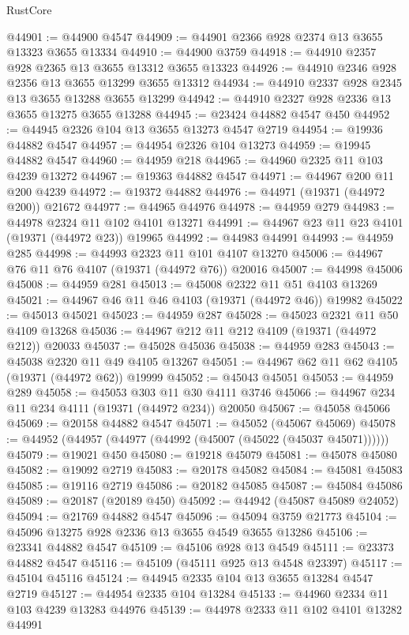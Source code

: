 \begin{lexlean}{RustCore}
\begin{coremodule}
@44901 := @44900 @4547
@44909 := @44901 @2366 @928 @2374 @13 @3655 @13323 @3655 @13334
@44910 := @44900 @3759
@44918 := @44910 @2357 @928 @2365 @13 @3655 @13312 @3655 @13323
@44926 := @44910 @2346 @928 @2356 @13 @3655 @13299 @3655 @13312
@44934 := @44910 @2337 @928 @2345 @13 @3655 @13288 @3655 @13299
@44942 := @44910 @2327 @928 @2336 @13 @3655 @13275 @3655 @13288
@44945 := @23424 @44882 @4547 @450
@44952 := @44945 @2326 @104 @13 @3655 @13273 @4547 @2719
@44954 := @19936 @44882 @4547
@44957 := @44954 @2326 @104 @13273
@44959 := @19945 @44882 @4547
@44960 := @44959 @218
@44965 := @44960 @2325 @11 @103 @4239 @13272
@44967 := @19363 @44882 @4547
@44971 := @44967 @200 @11 @200 @4239
@44972 := @19372 @44882
@44976 := @44971 (@19371 (@44972 @200)) @21672
@44977 := @44965 @44976
@44978 := @44959 @279
@44983 := @44978 @2324 @11 @102 @4101 @13271
@44991 := @44967 @23 @11 @23 @4101 (@19371 (@44972 @23)) @19965
@44992 := @44983 @44991
@44993 := @44959 @285
@44998 := @44993 @2323 @11 @101 @4107 @13270
@45006 := @44967 @76 @11 @76 @4107 (@19371 (@44972 @76)) @20016
@45007 := @44998 @45006
@45008 := @44959 @281
@45013 := @45008 @2322 @11 @51 @4103 @13269
@45021 := @44967 @46 @11 @46 @4103 (@19371 (@44972 @46)) @19982
@45022 := @45013 @45021
@45023 := @44959 @287
@45028 := @45023 @2321 @11 @50 @4109 @13268
@45036 := @44967 @212 @11 @212 @4109 (@19371 (@44972 @212)) @20033
@45037 := @45028 @45036
@45038 := @44959 @283
@45043 := @45038 @2320 @11 @49 @4105 @13267
@45051 := @44967 @62 @11 @62 @4105 (@19371 (@44972 @62)) @19999
@45052 := @45043 @45051
@45053 := @44959 @289
@45058 := @45053 @303 @11 @30 @4111 @3746
@45066 := @44967 @234 @11 @234 @4111 (@19371 (@44972 @234)) @20050
@45067 := @45058 @45066
@45069 := @20158 @44882 @4547
@45071 := @45052 (@45067 @45069)
@45078 := @44952 (@44957 (@44977 (@44992 (@45007 (@45022 (@45037 @45071))))))
@45079 := @19021 @450
@45080 := @19218 @45079
@45081 := @45078 @45080
@45082 := @19092 @2719
@45083 := @20178 @45082
@45084 := @45081 @45083
@45085 := @19116 @2719
@45086 := @20182 @45085
@45087 := @45084 @45086
@45089 := @20187 (@20189 @450)
@45092 := @44942 (@45087 @45089 @24052)
@45094 := @21769 @44882 @4547
@45096 := @45094 @3759 @21773
@45104 := @45096 @13275 @928 @2336 @13 @3655 @4549 @3655 @13286
@45106 := @23341 @44882 @4547
@45109 := @45106 @928 @13 @4549
@45111 := @23373 @44882 @4547
@45116 := @45109 (@45111 @925 @13 @4548 @23397)
@45117 := @45104 @45116
@45124 := @44945 @2335 @104 @13 @3655 @13284 @4547 @2719
@45127 := @44954 @2335 @104 @13284
@45133 := @44960 @2334 @11 @103 @4239 @13283 @44976
@45139 := @44978 @2333 @11 @102 @4101 @13282 @44991

\end{coremodule}
\end{lexlean}
